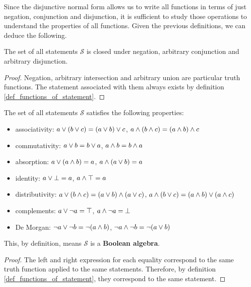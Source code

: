 \documentclass[11pt,letterpaper,fleqn]{memoir} %
\begin{document}
Since the disjunctive normal form allows us to write all functions in terms of just negation, conjunction and disjunction, it is sufficient to study those operations to understand the properties of all functions. Given the previous definitions, we can deduce the following.

\begin{mathSection}
	\begin{prop}
		The set of all statements $\mathcal{S}$ is closed under negation, arbitrary conjunction and arbitrary disjunction.
	\end{prop}
	\begin{proof}
		Negation, arbitrary intersection and arbitrary union are particular truth functions. The statement associated with them always exists by definition  \eqref{def_functions_of_statement}.
	\end{proof}
	\begin{prop}\label{boolean_properties}
		The set of all statements $\mathcal{S}$ satisfies the following properties:
		\begin{itemize}
			\item associativity: $a \vee (b \vee c) = (a \vee b) \vee c$, $a \wedge (b \wedge c) = (a \wedge b) \wedge c$
			\item commutativity: $a \vee b = b \vee a$, $a \wedge b = b \wedge a$
			\item absorption: $a \vee (a \wedge b) = a$, $a \wedge (a \vee b) = a$
			\item identity: $a \vee \bot = a
			$, $a \wedge \top = a$
			\item distributivity: $a \vee (b \wedge c) = (a \vee b) \wedge (a \vee c)$, $a \wedge (b \vee c) = (a \wedge b) \vee (a \wedge c)$
			\item complements: $a \vee \neg a = \top$, $a \wedge \neg a = \bot$
			\item De Morgan: $\neg a \vee \neg b = \neg (a \wedge b)$, $\neg a \wedge \neg b = \neg (a \vee b)$
		\end{itemize}
		This, by definition, means $\mathcal{S}$ is a \textbf{Boolean algebra}.
	\end{prop}
	\begin{proof}
		The left and right expression for each equality correspond to the same truth function applied to the same statements. Therefore, by definition  \eqref{def_functions_of_statement}, they correspond to the same statement.
	\end{proof}
\end{mathSection}
\end{document}
